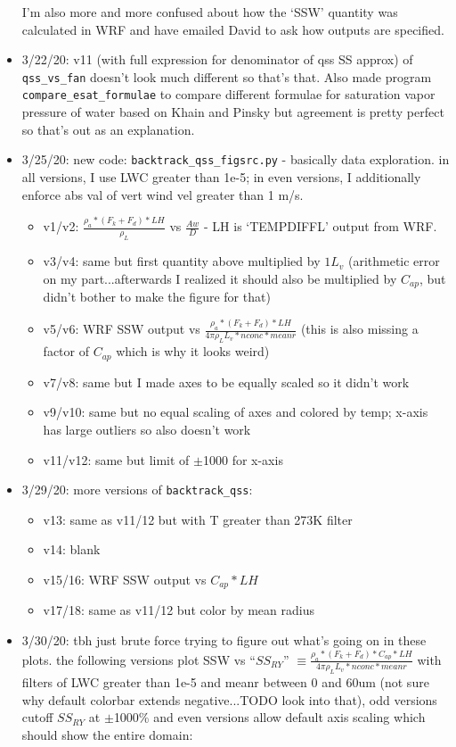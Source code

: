 \documentclass{article}
\begin{document}
\begin{itemize}
	I'm also more and more confused about how the `SSW' quantity was calculated in WRF and have emailed David to ask how outputs are specified.
	\item 3/22/20: v11 (with full expression for denominator of qss SS approx) of \texttt{qss\_vs\_fan} doesn't look much different so that's that. Also made program \texttt{compare\_esat\_formulae} to compare different formulae for saturation vapor pressure of water based on Khain and Pinsky but agreement is pretty perfect so that's out as an explanation. 	
	\item 3/25/20: new code: \texttt{backtrack\_qss\_figsrc.py} - basically data exploration. in all versions, I use LWC greater than 1e-5; in even versions, I additionally enforce abs val of vert wind vel greater than 1 m/s.
	\begin{itemize}
		\item v1/v2: $\frac{\rho_a*(F_k + F_d)*LH}{\rho_L}$ vs $\frac{Aw}{D}$ - LH is `TEMPDIFFL' output from WRF.
		\item v3/v4: same but first quantity above multiplied by ${1}{L_v}$ (arithmetic error on my part...afterwards I realized it should also be multiplied by $C_{ap}$, but didn't bother to make the figure for that)
		\item v5/v6: WRF SSW output vs $\frac{\rho_a*(F_k + F_d)*LH}{4\pi \rho_L L_v *nconc*meanr}$ (this is also missing a factor of $C_{ap}$ which is why it looks weird)
		\item v7/v8: same but I made axes to be equally scaled so it didn't work
		\item v9/v10: same but no equal scaling of axes and colored by temp; x-axis has large outliers so also doesn't work
		\item v11/v12: same but limit of $\pm$1000 for x-axis
	\end{itemize}
	\item 3/29/20: more versions of \texttt{backtrack\_qss}:
	\begin{itemize}
		\item v13: same as v11/12 but with T greater than 273K filter
		\item v14: blank
		\item v15/16: WRF SSW output vs $C_{ap}*LH$
		\item v17/18: same as v11/12 but color by mean radius
	\end{itemize}
	\item 3/30/20: tbh just brute force trying to figure out what's going on in these plots. the following versions plot SSW vs ``$SS_{RY}$'' $\equiv\frac{\rho_a*(F_k + F_d)*C_{ap}*LH}{4 \pi \rho_L L_v*nconc*meanr}$ with filters of LWC greater than 1e-5 and meanr between 0 and 60um (not sure why default colorbar extends negative...TODO look into that), odd versions cutoff $SS_{RY}$ at $\pm$1000\% and even versions allow default axis scaling which should show the entire domain:

\end{itemize}
\end{document}
